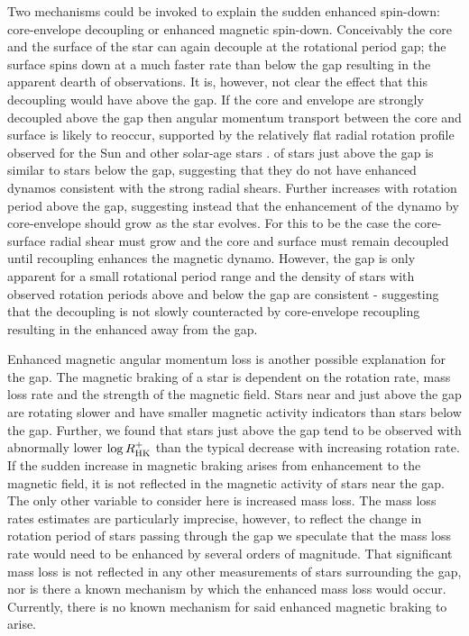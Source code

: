 Two mechanisms could be invoked to explain the sudden enhanced spin-down: core-envelope decoupling or enhanced magnetic spin-down.
Conceivably the core and the surface of the star can again decouple at the rotational period gap; the surface spins down at a much faster rate than below the gap resulting in the apparent dearth of observations.
It is, however, not clear the effect that this decoupling would have above the gap.
If the core and envelope are strongly decoupled above the gap then angular momentum transport between the core and surface is likely to reoccur, supported by the relatively flat radial rotation profile observed for the Sun and other solar-age stars \citep{hall}.
\rper{} of stars just above the gap is similar to stars below the gap, suggesting that they do not have enhanced dynamos consistent with the strong radial shears.
Further \rper{} increases with rotation period above the gap, suggesting instead that the enhancement of the dynamo by core-envelope should grow as the star evolves.
For this to be the case the core-surface radial shear must grow and the core and surface must remain decoupled until recoupling enhances the magnetic dynamo.
However, the gap is only apparent for a small rotational period range and the density of stars with observed rotation periods above and below the gap are consistent - suggesting that the decoupling is not slowly counteracted by core-envelope recoupling resulting in the enhanced \rper{} away from the gap.


Enhanced magnetic angular momentum loss is another possible explanation for the gap.
The magnetic braking of a star is dependent on the rotation rate, mass loss rate and the strength of the magnetic field.
Stars near and just above the gap are rotating slower and have smaller magnetic activity indicators than stars below the gap.
Further, we found that stars just above the gap tend to be observed with abnormally lower $\log R^{+}_{\rm{HK}}$ than the typical decrease with increasing rotation rate.
If the sudden increase in magnetic braking arises from enhancement to the magnetic field, it is not reflected in the magnetic activity of stars near the gap.
The only other variable to consider here is increased mass loss.
The mass loss rates estimates are particularly imprecise, however, to reflect the change in rotation period of stars passing through the gap we speculate that the mass loss rate would need to be enhanced by several orders of magnitude. 
That significant mass loss is not reflected in any other measurements of stars surrounding the gap, nor is there a known mechanism by which the enhanced mass loss would occur.
Currently, there is no known mechanism for said enhanced magnetic braking to arise.


